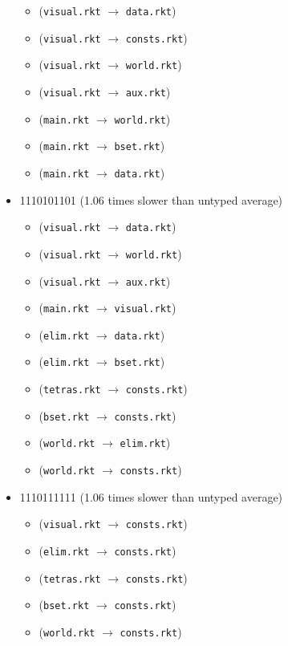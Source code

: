 \documentclass{article}
\newcommand{\mono}[1]{\texttt{#1}}
\begin{document}
\begin{itemize}
  \begin{itemize}
  \item (\mono{visual.rkt} $\rightarrow$ \mono{data.rkt})
  \item (\mono{visual.rkt} $\rightarrow$ \mono{consts.rkt})
  \item (\mono{visual.rkt} $\rightarrow$ \mono{world.rkt})
  \item (\mono{visual.rkt} $\rightarrow$ \mono{aux.rkt})
  \item (\mono{main.rkt} $\rightarrow$ \mono{world.rkt})
  \item (\mono{main.rkt} $\rightarrow$ \mono{bset.rkt})
  \item (\mono{main.rkt} $\rightarrow$ \mono{data.rkt})
  \end{itemize}
\item 1110101101 (1.06 times slower than untyped average)
  \begin{itemize}
  \item (\mono{visual.rkt} $\rightarrow$ \mono{data.rkt})
  \item (\mono{visual.rkt} $\rightarrow$ \mono{world.rkt})
  \item (\mono{visual.rkt} $\rightarrow$ \mono{aux.rkt})
  \item (\mono{main.rkt} $\rightarrow$ \mono{visual.rkt})
  \item (\mono{elim.rkt} $\rightarrow$ \mono{data.rkt})
  \item (\mono{elim.rkt} $\rightarrow$ \mono{bset.rkt})
  \item (\mono{tetras.rkt} $\rightarrow$ \mono{consts.rkt})
  \item (\mono{bset.rkt} $\rightarrow$ \mono{consts.rkt})
  \item (\mono{world.rkt} $\rightarrow$ \mono{elim.rkt})
  \item (\mono{world.rkt} $\rightarrow$ \mono{consts.rkt})
  \end{itemize}
\item 1110111111 (1.06 times slower than untyped average)
  \begin{itemize}
  \item (\mono{visual.rkt} $\rightarrow$ \mono{consts.rkt})
  \item (\mono{elim.rkt} $\rightarrow$ \mono{consts.rkt})
  \item (\mono{tetras.rkt} $\rightarrow$ \mono{consts.rkt})
  \item (\mono{bset.rkt} $\rightarrow$ \mono{consts.rkt})
  \item (\mono{world.rkt} $\rightarrow$ \mono{consts.rkt})

\end{itemize}
\end{itemize}
\end{document}
